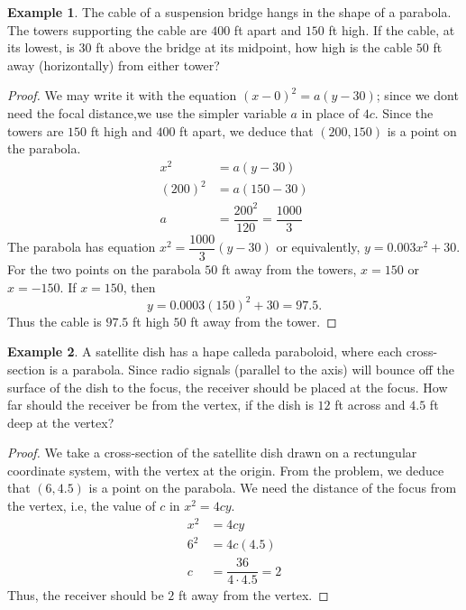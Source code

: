 \documentclass[a4paper]{article}
\theoremstyle{definition}
\newtheorem*{eg}{Example}
\begin{document}
\begin{eg}
     The cable of a suspension bridge hangs in the shape of a parabola. The
     towers supporting the cable are $400$ ft apart and $150$ ft high. If the
     cable, at its lowest, is $30$ ft above the bridge at its midpoint, how high
     is the cable $50$ ft away (horizontally) from either tower?
     \medbreak
     \begin{proof}
           We may write it with the equation $(x-0)^2=a(y-30)$; since we dont
          need the focal distance,we use the simpler variable $a$ in place of
          $4c$. Since the towers are $150$ ft high and $400$ ft apart, we deduce
          that $(200,150)$ is a point on the parabola.
          \begin{align*}
                x^2 &= a(y-30) \\[1.25ex]
                (200)^2 &= a(150-30) \\[1.25ex]
                a &= \dfrac{200^2}{120} = \dfrac{1000}{3}
          \end{align*}
          The parabola has equation $x^2=\dfrac{1000}{3}(y-30)$ or equivalently,
          $y=0.003x^2+30$. For the two points on the parabola $50$ ft away from
          the towers, $x=150$ or $x=-150$. If $x =150$, then
          \begin{equation*}
                y = 0.0003(150)^2 +30 = 97.5.
          \end{equation*} 
          Thus the cable is $97.5$ ft high $50$ ft away from the tower.
     \end{proof}
\end{eg}
\begin{eg}
      A satellite dish has a hape calleda paraboloid, where each cross-section
      is a parabola. Since radio signals (parallel to the axis) will bounce off
      the surface of the dish to the focus, the receiver should be placed at the
      focus. How far should the receiver be from the vertex, if the dish is $12$
      ft across and $4.5$ ft deep at the vertex?
      \begin{proof}
            We take a cross-section of the satellite dish drawn on a rectungular
            coordinate system, with the vertex at the origin. From the problem,
            we deduce that $(6,4.5)$ is a point on the parabola. We need the
            distance of the focus from the vertex, i.e, the value of $c$ in
            $x^2=4cy$.
            \begin{align*}
                 x^2 &= 4cy \\[1.25ex]
                 6^2 &= 4c(4.5) \\[1.25ex]
                 c &= \dfrac{36}{4 \cdot 4.5} = 2
            \end{align*}
            Thus, the receiver should be $2$ ft away from the vertex. 
      \end{proof} 
\end{eg}
\end{document}
